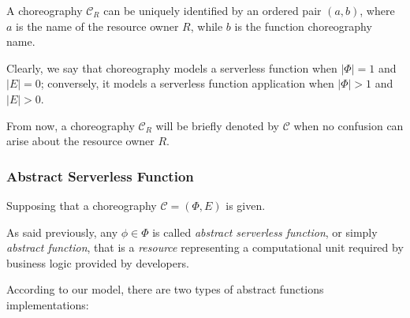 A choreography $\mathcal{C}_R$ can be uniquely identified by an ordered pair $(a, b)$, where $a$ is the name of the resource owner $R$, while $b$ is the function choreography name.

Clearly, we say that choreography models a serverless function when $|\Phi| = 1$ and $|E| = 0$; conversely, it models a serverless function application when $|\Phi| > 1$ and $|E| > 0$.

From now, a choreography $\mathcal{C}_R$ will be briefly denoted by $\mathcal{C}$ when no confusion can arise about the resource owner $R$.

\subsubsection{Abstract Serverless Function}

Supposing that a choreography $\mathcal{C} = (\Phi,E)$ is given.

As said previously, any $\phi \in \Phi$ is called \textit{abstract serverless function}, or simply \textit{abstract function}, that is a \textit{resource} representing a computational unit required by business logic provided by developers.

According to our model, there are two types of abstract functions implementations:

